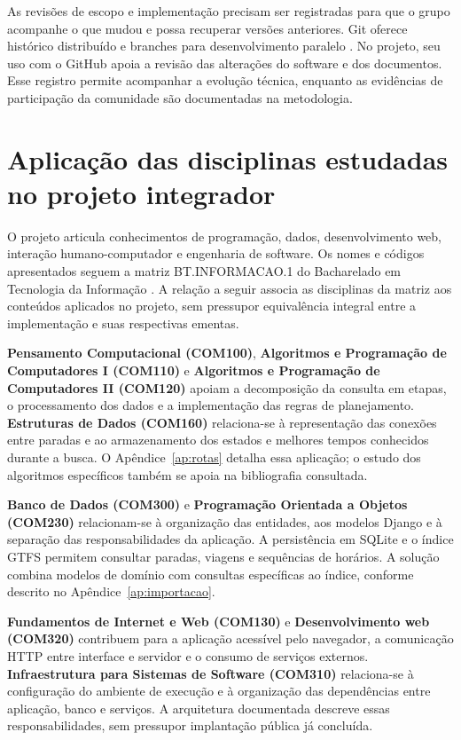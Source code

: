 \documentclass[12pt,oneside,a4paper,brazil,chapter=TITLE]{abntex2}
\let\papsection\section
\renewcommand{\section}{\clearpage\papsection}
\begin{document}
As revisões de escopo e implementação precisam ser registradas para que o grupo acompanhe o que mudou e possa recuperar versões anteriores. Git oferece histórico distribuído e branches para desenvolvimento paralelo \citep{git}. No projeto, seu uso com o GitHub apoia a revisão das alterações do software e dos documentos. Esse registro permite acompanhar a evolução técnica, enquanto as evidências de participação da comunidade são documentadas na metodologia.

\section{Aplicação das disciplinas estudadas no projeto integrador}
O projeto articula conhecimentos de programação, dados, desenvolvimento web, interação humano-computador e engenharia de software. Os nomes e códigos apresentados seguem a matriz BT.INFORMACAO.1 do Bacharelado em Tecnologia da Informação \citep{matriz2026}. A relação a seguir associa as disciplinas da matriz aos conteúdos aplicados no projeto, sem pressupor equivalência integral entre a implementação e suas respectivas ementas.

\textbf{Pensamento Computacional (COM100)}, \textbf{Algoritmos e Programação de Computadores I (COM110)} e \textbf{Algoritmos e Programação de Computadores II (COM120)} apoiam a decomposição da consulta em etapas, o processamento dos dados e a implementação das regras de planejamento. \textbf{Estruturas de Dados (COM160)} relaciona-se à representação das conexões entre paradas e ao armazenamento dos estados e melhores tempos conhecidos durante a busca. O Apêndice~\ref{ap:rotas} detalha essa aplicação; o estudo dos algoritmos específicos também se apoia na bibliografia consultada.

\textbf{Banco de Dados (COM300)} e \textbf{Programação Orientada a Objetos (COM230)} relacionam-se à organização das entidades, aos modelos Django e à separação das responsabilidades da aplicação. A persistência em SQLite e o índice GTFS permitem consultar paradas, viagens e sequências de horários. A solução combina modelos de domínio com consultas específicas ao índice, conforme descrito no Apêndice~\ref{ap:importacao}.

\textbf{Fundamentos de Internet e Web (COM130)} e \textbf{Desenvolvimento web (COM320)} contribuem para a aplicação acessível pelo navegador, a comunicação HTTP entre interface e servidor e o consumo de serviços externos. \textbf{Infraestrutura para Sistemas de Software (COM310)} relaciona-se à configuração do ambiente de execução e à organização das dependências entre aplicação, banco e serviços. A arquitetura documentada descreve essas responsabilidades, sem pressupor implantação pública já concluída.
\end{document}
